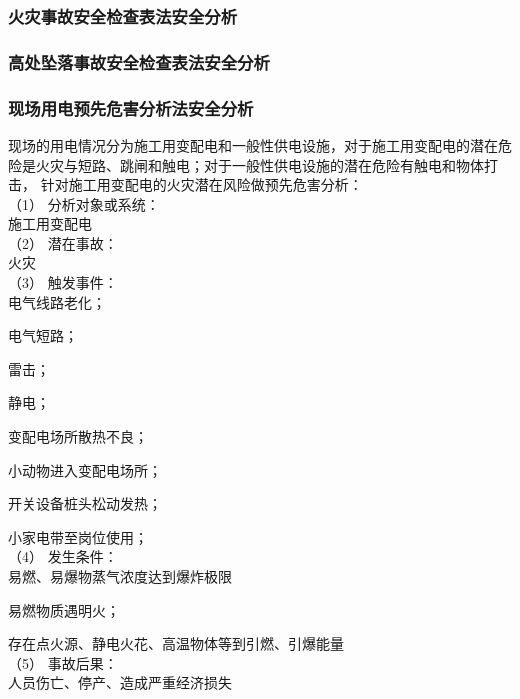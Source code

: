 \subsubsection{火灾事故安全检查表法安全分析}
\subsubsection{高处坠落事故安全检查表法安全分析}
\subsubsection{现场用电预先危害分析法安全分析}

现场的用电情况分为施工用变配电和一般性供电设施，对于施工用变配电的潜在危险是火灾与短路、跳闸和触电；对于一般性供电设施的潜在危险有触电和物体打击，
针对施工用变配电的火灾潜在风险做预先危害分析：\\

（1） 分析对象或系统：\\

施工用变配电\\

（2） 潜在事故：\\

火灾\\

（3） 触发事件：\\

 电气线路老化；

 电气短路；

 雷击；

 静电；

 变配电场所散热不良；

 小动物进入变配电场所；

 开关设备桩头松动发热；

小家电带至岗位使用；\\

（4） 发生条件：\\

 易燃、易爆物蒸气浓度达到爆炸极限 

 易燃物质遇明火；

 存在点火源、静电火花、高温物体等到引燃、引爆能量\\

（5） 事故后果：\\

人员伤亡、停产、造成严重经济损失\\

